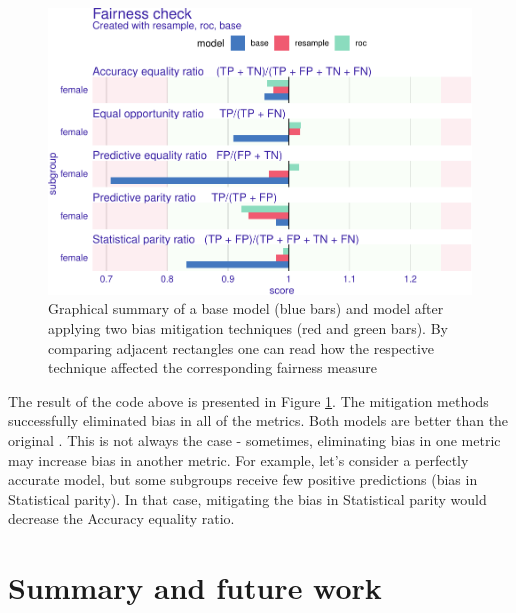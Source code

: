 \begin{figure}

{\centering \includegraphics[width=0.8\linewidth]{Wisniewski-Biecek_files/figure-latex/mitigation-1} 

}

\caption[Graphical summary of a base model (blue bars) and model after applying two bias mitigation techniques (red and green bars)]{Graphical summary of a base model (blue bars) and model after applying two bias mitigation techniques (red and green bars). By comparing adjacent rectangles one can read how the respective technique affected the corresponding fairness measure}\label{fig:mitigation}
\end{figure}

The result of the code above is presented in Figure
\ref{fig:mitigation}. The mitigation methods successfully eliminated
bias in all of the metrics. Both models are better than the original
. This is not always the case - sometimes, eliminating bias
in one metric may increase bias in another metric. For example, let's
consider a perfectly accurate model, but some subgroups receive few
positive predictions (bias in Statistical parity). In that case,
mitigating the bias in Statistical parity would decrease the Accuracy
equality ratio.

\hypertarget{summary-and-future-work}{%
\section{Summary and future work}\label{summary-and-future-work}}

